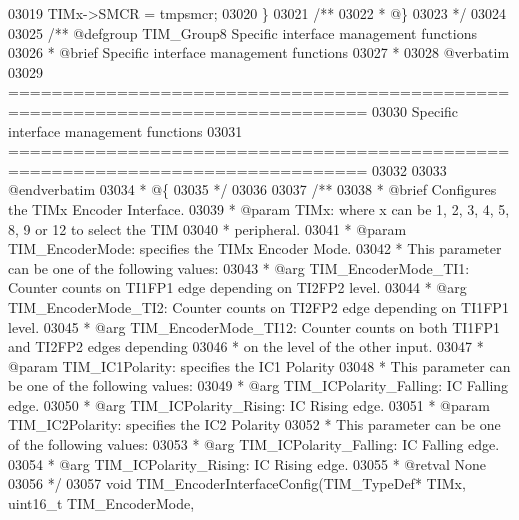 \begin{DoxyCode}
03019   TIMx->SMCR = tmpsmcr;
03020 \}
03021 \textcolor{comment}{/**}
03022 \textcolor{comment}{  * @\}}
03023 \textcolor{comment}{  */}
03024 
03025 \textcolor{comment}{/** @defgroup TIM\_Group8 Specific interface management functions}
03026 \textcolor{comment}{ *  @brief    Specific interface management functions }
03027 \textcolor{comment}{ *}
03028 \textcolor{comment}{@verbatim   }
03029 \textcolor{comment}{ ===============================================================================}
03030 \textcolor{comment}{                    Specific interface management functions}
03031 \textcolor{comment}{ ===============================================================================  }
03032 \textcolor{comment}{}
03033 \textcolor{comment}{@endverbatim}
03034 \textcolor{comment}{  * @\{}
03035 \textcolor{comment}{  */}
03036 
03037 \textcolor{comment}{/**}
03038 \textcolor{comment}{  * @brief  Configures the TIMx Encoder Interface.}
03039 \textcolor{comment}{  * @param  TIMx: where x can be 1, 2, 3, 4, 5, 8, 9 or 12 to select the TIM }
03040 \textcolor{comment}{  *         peripheral.}
03041 \textcolor{comment}{  * @param  TIM\_EncoderMode: specifies the TIMx Encoder Mode.}
03042 \textcolor{comment}{  *          This parameter can be one of the following values:}
03043 \textcolor{comment}{  *            @arg TIM\_EncoderMode\_TI1: Counter counts on TI1FP1 edge depending on TI2FP2 level.}
03044 \textcolor{comment}{  *            @arg TIM\_EncoderMode\_TI2: Counter counts on TI2FP2 edge depending on TI1FP1 level.}
03045 \textcolor{comment}{  *            @arg TIM\_EncoderMode\_TI12: Counter counts on both TI1FP1 and TI2FP2 edges depending}
03046 \textcolor{comment}{  *                                       on the level of the other input.}
03047 \textcolor{comment}{  * @param  TIM\_IC1Polarity: specifies the IC1 Polarity}
03048 \textcolor{comment}{  *          This parameter can be one of the following values:}
03049 \textcolor{comment}{  *            @arg TIM\_ICPolarity\_Falling: IC Falling edge.}
03050 \textcolor{comment}{  *            @arg TIM\_ICPolarity\_Rising: IC Rising edge.}
03051 \textcolor{comment}{  * @param  TIM\_IC2Polarity: specifies the IC2 Polarity}
03052 \textcolor{comment}{  *          This parameter can be one of the following values:}
03053 \textcolor{comment}{  *            @arg TIM\_ICPolarity\_Falling: IC Falling edge.}
03054 \textcolor{comment}{  *            @arg TIM\_ICPolarity\_Rising: IC Rising edge.}
03055 \textcolor{comment}{  * @retval None}
03056 \textcolor{comment}{  */}
03057 \textcolor{keywordtype}{void} TIM_EncoderInterfaceConfig(TIM\_TypeDef* TIMx, uint16\_t TIM\_EncoderMode,

\end{DoxyCode}
